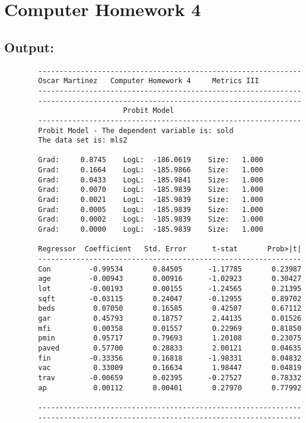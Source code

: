 \documentclass[12pt]{article}
\begin{document}
	
	
	\section*{Computer Homework 4}
	\subsection*{Output:}
	\begin{verbatim}
		--------------------------------------------------------------
		Oscar Martinez 	 Computer Homework 4 	 Metrics III
		--------------------------------------------------------------
		--------------------------------------------------------------
							Probit Model 
		--------------------------------------------------------------
		Probit Model - The dependent variable is: sold
		The data set is: mls2
		
		Grad:     0.8745    LogL:  -186.0619    Size:   1.000
		Grad:     0.1664    LogL:  -185.9866    Size:   1.000
		Grad:     0.0433    LogL:  -185.9841    Size:   1.000
		Grad:     0.0070    LogL:  -185.9839    Size:   1.000
		Grad:     0.0021    LogL:  -185.9839    Size:   1.000
		Grad:     0.0005    LogL:  -185.9839    Size:   1.000
		Grad:     0.0002    LogL:  -185.9839    Size:   1.000
		Grad:     0.0000    LogL:  -185.9839    Size:   1.000
		
		Regressor  Coefficient	 Std. Error 	 t-stat       Prob>|t|
		--------------------------------------------------------------
		Con         -0.99534       0.84505      -1.17785       0.23987 
		age         -0.00943       0.00916      -1.02923       0.30427 
		lot         -0.00193       0.00155      -1.24565       0.21395 
		sqft        -0.03115       0.24047      -0.12955       0.89702 
		beds         0.07050       0.16585       0.42507       0.67112 
		gar          0.45793       0.18757       2.44135       0.01526 
		mfi          0.00358       0.01557       0.22969       0.81850 
		pmin         0.95717       0.79693       1.20108       0.23075 
		paved        0.57700       0.28833       2.00121       0.04635 
		fin         -0.33356       0.16818      -1.98331       0.04832 
		vac          0.33009       0.16634       1.98447       0.04819 
		trav        -0.00659       0.02395      -0.27527       0.78332 
		ap           0.00112       0.00401       0.27970       0.77992 
		
		--------------------------------------------------------------
		--------------------------------------------------------------
		

\end{verbatim}
\end{document}
